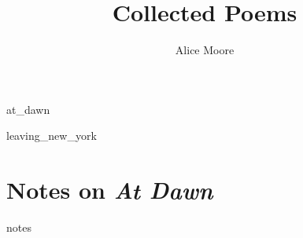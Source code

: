 \documentclass[ebook, twoside,openright, final]{memoir}
\title{Collected Poems}
\author{Alice Moore}
\date{}
\begin{document}
\setlength\epigraphwidth{5cm}
\setlength\epigraphrule{0pt}
\epigraphfontsize{\footnotesize}

\setlength\vgap{2.5em}

\PlainPoemTitle

\pagestyle{simple}

\frontmatter

\begin{titlingpage}
\maketitle
\end{titlingpage}

\let\tocheadstart\relax
\tableofcontents*

\renewcommand{\printpartnum}{}
\renewcommand{\printpartname}{}
\renewcommand{\printchaptername}{}
\renewcommand{\printchapternum}{}

\mainmatter

{at_dawn}

{leaving_new_york}

\renewcommand\appendixname{Notes}

\appendix

\chapter{Notes on \textit{At Dawn}}
{notes}
\end{document}
